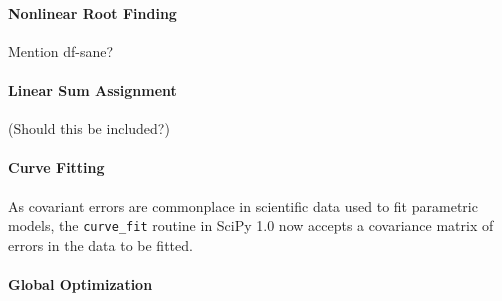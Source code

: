 \paragraph{Nonlinear Root Finding}
Mention df-sane?

\paragraph{Linear Sum Assignment}
(Should this be included?)

\paragraph{Curve Fitting}
As covariant errors are commonplace in scientific data used to fit parametric models, the \texttt{curve\_fit} routine in SciPy 1.0 now accepts a covariance matrix of errors in the data to be fitted. 

\paragraph{Global Optimization}


